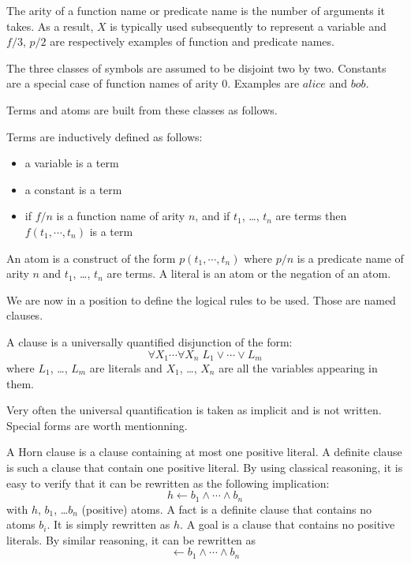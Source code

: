 \noindent
The arity of a function name or predicate name is the number of arguments it takes. As a result, $X$ is typically used subsequently to
represent a variable and $f/3$, $p/2$ are respectively examples of function and predicate names.

The three classes of symbols are assumed to be disjoint two by two. Constants are a special case of function names of arity
$0$. Examples are $\mathit{alice}$ and $\mathit{bob}$.

Terms and atoms are built from these classes as follows.

\begin{definition}
Terms are inductively defined as follows:

\begin{itemize}

\item a variable is a term
\item a constant is a term
\item if $f/n$ is a function name of arity $n$, and if $t_1$, \ldots, $t_n$ are terms then
  $f(t_1,\cdots,t_n)$ is a term
  
\end{itemize}
\end{definition}

\begin{definition}
An atom is a construct of the form $p(t_1,\cdots,t_n)$ where $p/n$ is
a predicate name of arity $n$ and $t_1$, \ldots, $t_n$ are terms. A
literal is an atom or the negation of an atom.
\end{definition}

We are now in a position to define the logical rules to be used. Those are named clauses.

\begin{definition}
A clause is a universally quantified disjunction of the form:
\[ \forall X_1 \cdots \forall X_n \; L_1 \vee \cdots \vee L_m \]
where $L_1$, \ldots, $L_m$ are literals and $X_1$, \ldots, $X_n$ are all the variables appearing in them. 
\end{definition}

Very often the universal quantification is taken as implicit and is not
written.  Special forms are worth mentionning.

\begin{definition}
A Horn clause is a clause containing at most one positive literal. A
definite clause is such a clause that contain one positive
literal. By using classical reasoning, it is easy to verify that
it can be rewritten as the following implication:
\[ h \leftarrow b_1 \wedge \cdots \wedge b_n \]
with $h$, $b_1$, \ldots $b_n$ (positive) atoms.
A fact is a definite clause that contains no atoms $b_i$. It is simply rewritten as \( h \).
A goal is a clause that contains no positive literals. By similar reasoning, it can be rewritten as
\[ \leftarrow b_1 \wedge \cdots \wedge b_n \]
\end{definition}

